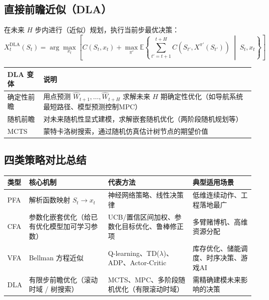 \documentclass[11pt, a4paper]{article}
\begin{document}
\subsection{直接前瞻近似（DLA）}

在未来 $H$ 步内进行（近似）规划，执行当前步最优决策：
\begin{equation}
  X_t^{\text{DLA}}(S_t) = \arg\max_{x_t}\!\left[C(S_t, x_t) + \max_{\pi'} \mathbb{E}\!\left\{\sum_{t'=t+1}^{t+H} C(S_{t'}, X^{\pi'}(S_{t'})) \;\middle|\; S_t, x_t\right\}\right]
  \label{eq:dla}
\end{equation}

\begin{center}
\begin{tabular}{lp{11cm}}
\toprule
\textbf{DLA 变体} & \textbf{说明} \\
\midrule
确定性前瞻 & 用点预测 $\hat{W}_{t+1}, \ldots, \hat{W}_{t+H}$ 求解未来 $H$ 期确定性优化（如导航系统最短路径、模型预测控制MPC） \\
\addlinespace
随机前瞻 & 对未来随机性显式建模，求解嵌套随机优化（两阶段随机规划等） \\
\addlinespace
MCTS & 蒙特卡洛树搜索，通过随机仿真估计树节点的期望价值 \\
\bottomrule
\end{tabular}
\end{center}

\subsection{四类策略对比总结}

\begin{center}
\begin{tabular}{p{1.6cm}p{3.2cm}p{3.5cm}p{4cm}}
\toprule
\textbf{类型} & \textbf{核心机制} & \textbf{代表方法} & \textbf{典型适用场景} \\
\midrule
PFA & 解析函数映射 $S_t \to x_t$ & 神经网络策略、线性决策律 & 低维连续动作、工程落地最广 \\
\addlinespace
CFA & 参数化嵌套优化（给已有优化模型加可学习参数） & UCB/置信区间加权、参数化目标优化、鲁棒修正项 & 多臂赌博机、高维资源分配 \\
\addlinespace
VFA & Bellman 方程近似 & Q-learning、TD($\lambda$)、ADP、Actor-Critic & 库存优化、储能调度、时序决策、游戏AI \\
\addlinespace
DLA & 有限步前瞻优化（滚动时域 / 树搜索） & MCTS、MPC、多阶段随机优化（有限滚动时域） & 需精确建模未来影响的决策 \\
\bottomrule
\end{tabular}
\end{center}
\end{document}
